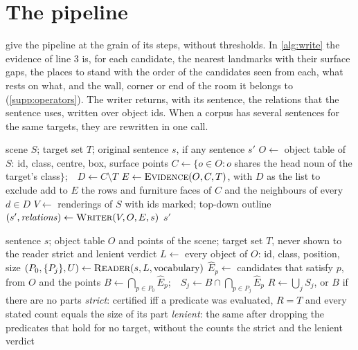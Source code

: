 \section{The pipeline}
\label{supp:pipeline}
 give the pipeline at the grain of its steps, without thresholds.
In \cref{alg:write} the evidence of line 3 is, for each candidate, the nearest landmarks with their surface gaps, the places to stand with the order of the candidates seen from each, what rests on what, and the wall, corner or end of the room it belongs to (\cref{supp:operators}).
The writer returns, with its sentence, the relations that the sentence uses, written over object ids.
When a corpus has several sentences for the same targets, they are rewritten in one call.
\begin{algorithm}[t]
\caption{Writing a sentence}
\label{alg:write}
\begin{algorithmic}[1]
\small
\Require scene $S$; target set $T$; original sentence $s$, if any
\Ensure sentence $s'$
\State $O \gets$ object table of $S$: id, class, centre, box, surface points
\State $C \gets \{o \in O : o$ shares the head noun of the target's class$\}$;\ \ $D \gets C \setminus T$
\State $E \gets \textsc{Evidence}(O, C, T)$, with $D$ as the list to exclude
  \State add to $E$ the rows and furniture faces of $C$ and the neighbours of every $d \in D$
\EndIf
\State $V \gets$ renderings of $S$ with ids marked; top-down outline
\State $(s', \mathit{relations}) \gets \textsc{Writer}(V, O, E, s)$ 
\State \Return $s'$ 
\end{algorithmic}
\end{algorithm}
\begin{algorithm}[t]
\caption{Scoring a sentence}
\label{alg:score}
\begin{algorithmic}[1]
\small
\Require sentence $s$; object table $O$ and points of the scene; target set $T$, never shown to the reader
\Ensure strict and lenient verdict
\State $L \gets$ every object of $O$: id, class, position, size
\State $(P_0, \{P_j\}, U) \gets \textsc{Reader}(s, L, \text{vocabulary})$ 
  \State $\hat{E}_p \gets$ candidates that satisfy $p$, from $O$ and the points
\EndFor
\State $B \gets \bigcap_{p \in P_0} \hat{E}_p$;\ \ $S_j \gets B \cap \bigcap_{p \in P_j} \hat{E}_p$
\State $R \gets \bigcup_j S_j$, or $B$ if there are no parts 
\State \emph{strict}: certified iff a predicate was evaluated, $R = T$ and every stated count equals the size of its part
\State \emph{lenient}: the same after dropping the predicates that hold for no target, without the counts
\State \Return the strict and the lenient verdict
\end{algorithmic}
\end{algorithm}

